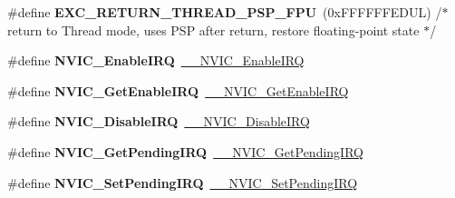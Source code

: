 \begin{DoxyCompactItemize}
\mbox{\label{group___c_m_s_i_s___core___n_v_i_c_functions_gadd2299e1d3a79c90b610c6b6f4cadb95}} 
\#define {\bfseries E\+X\+C\+\_\+\+R\+E\+T\+U\+R\+N\+\_\+\+T\+H\+R\+E\+A\+D\+\_\+\+P\+S\+P\+\_\+\+F\+PU}~(0x\+F\+F\+F\+F\+F\+F\+E\+D\+U\+L)     /$\ast$ return to Thread mode, uses P\+S\+P after return, restore floating-\/point state  $\ast$/
\item 
\mbox{\label{group___c_m_s_i_s___core___n_v_i_c_functions_ga57b3064413dbc7459d9646020fdd8bef}} 
\#define {\bfseries N\+V\+I\+C\+\_\+\+Enable\+I\+RQ}~\mbox{\hyperlink{group___c_m_s_i_s___core___n_v_i_c_functions_ga71227e1376cde11eda03fcb62f1b33ea}{\+\_\+\+\_\+\+N\+V\+I\+C\+\_\+\+Enable\+I\+RQ}}
\item 
\mbox{\label{group___c_m_s_i_s___core___n_v_i_c_functions_ga857de13232ec65dd15087eaa15bc4a69}} 
\#define {\bfseries N\+V\+I\+C\+\_\+\+Get\+Enable\+I\+RQ}~\mbox{\hyperlink{group___c_m_s_i_s___core___n_v_i_c_functions_gaaeb5e7cc0eaad4e2817272e7bf742083}{\+\_\+\+\_\+\+N\+V\+I\+C\+\_\+\+Get\+Enable\+I\+RQ}}
\item 
\mbox{\label{group___c_m_s_i_s___core___n_v_i_c_functions_ga73b4e251f59cab4e9a5e234aac02ae57}} 
\#define {\bfseries N\+V\+I\+C\+\_\+\+Disable\+I\+RQ}~\mbox{\hyperlink{group___c_m_s_i_s___core___n_v_i_c_functions_gae016e4c1986312044ee768806537d52f}{\+\_\+\+\_\+\+N\+V\+I\+C\+\_\+\+Disable\+I\+RQ}}
\item 
\mbox{\label{group___c_m_s_i_s___core___n_v_i_c_functions_gac608957a239466e9e0cbc30aa64feb3b}} 
\#define {\bfseries N\+V\+I\+C\+\_\+\+Get\+Pending\+I\+RQ}~\mbox{\hyperlink{group___c_m_s_i_s___core___n_v_i_c_functions_ga5a92ca5fa801ad7adb92be7257ab9694}{\+\_\+\+\_\+\+N\+V\+I\+C\+\_\+\+Get\+Pending\+I\+RQ}}
\item 
\mbox{\label{group___c_m_s_i_s___core___n_v_i_c_functions_ga2b47e2e52cf5c48a5c3348636434b3ac}} 
\#define {\bfseries N\+V\+I\+C\+\_\+\+Set\+Pending\+I\+RQ}~\mbox{\hyperlink{group___c_m_s_i_s___core___n_v_i_c_functions_gaabefdd4b790b9a7308929938c0c1e1ad}{\+\_\+\+\_\+\+N\+V\+I\+C\+\_\+\+Set\+Pending\+I\+RQ}}

\end{DoxyCompactItemize}
